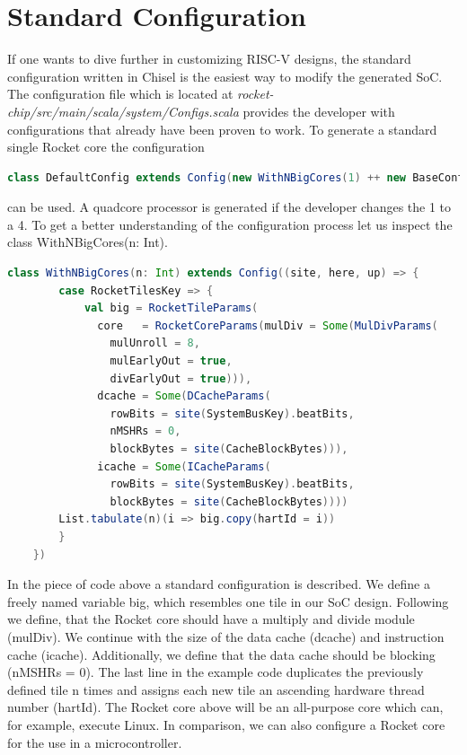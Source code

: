 \section{Standard Configuration}
If one wants to dive further in customizing RISC-V designs,
the standard configuration written in Chisel is the easiest way to 
modify the generated SoC. The configuration file which is located
at \textit{rocket-chip/src/main/scala/system/Configs.scala} provides
the developer with configurations that already have been proven to work.
To generate a standard single Rocket core
the configuration
\begin{lstlisting}[language=scala, frame=single]
    class DefaultConfig extends Config(new WithNBigCores(1) ++ new BaseConfig)
\end{lstlisting}
can be used. A quadcore processor is generated if the developer changes the
1 to a 4.
To get a better understanding of the configuration process
let us inspect the class WithNBigCores(n: Int).
\begin{lstlisting}[language=scala, frame=single]
    class WithNBigCores(n: Int) extends Config((site, here, up) => {
        case RocketTilesKey => {
            val big = RocketTileParams(
              core   = RocketCoreParams(mulDiv = Some(MulDivParams(
                mulUnroll = 8,
                mulEarlyOut = true,
                divEarlyOut = true))),
              dcache = Some(DCacheParams(
                rowBits = site(SystemBusKey).beatBits,
                nMSHRs = 0,
                blockBytes = site(CacheBlockBytes))),
              icache = Some(ICacheParams(
                rowBits = site(SystemBusKey).beatBits,
                blockBytes = site(CacheBlockBytes))))
        List.tabulate(n)(i => big.copy(hartId = i))
        }
    })
\end{lstlisting}
In the piece of code above a standard configuration
is described.
We define a freely named variable big, which
resembles one tile in our SoC design.
Following we define, that the Rocket core should
have a multiply and divide module (mulDiv).
We continue with the size of the data cache (dcache)
and instruction cache (icache).
Additionally, we define that the data cache should
be blocking (nMSHRs = 0).
The last line in the example code duplicates
the previously defined tile n times and
assigns each new tile an ascending hardware thread
number (hartId).
The Rocket core above will be an all-purpose core
which can, for example, execute Linux.
In comparison, we can also configure a Rocket core
for the use in a microcontroller.
